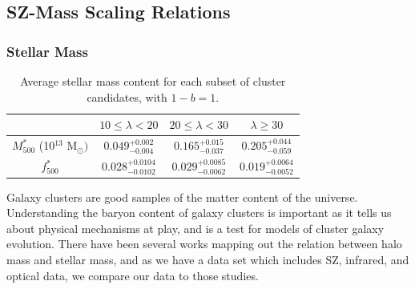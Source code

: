 \documentclass[a4paper,fleqn,usenatbib]{mnras}
\begin{document}
\iffalse
\subsection{SZ-Mass Scaling Relations}

\subsubsection{Stellar Mass}

\begin{table}
  
  \centering
  \caption{Average stellar mass content for each subset of cluster candidates, with $1-b=1$.}
  \begin{threeparttable}
  \begin{tabular}{|*{4}{c|}}
    \hline
    & $10 \leq \lambda < 20$ & $20 \leq \lambda < 30$ & $\lambda \geq 30$ \\ \hline
	 $M^{\ast}_{500}$ (10$^{13}$ M$_{\odot})$ & $0.049^{+0.002}_{-0.004}$ & $0.165^{+0.015}_{-0.037}$ & $0.205^{+0.044}_{-0.059}$ \\ \hline
     $f^{\ast}_{500}$ & $0.028^{+0.0104}_{-0.0102}$ & $0.029^{+0.0085}_{-0.0062}$ & $0.019^{+0.0064}_{-0.0052}$ \\ \hline
    
    \end{tabular}
  \end{threeparttable}
\label{table:stellarmass}
\end{table}

Galaxy clusters are good samples of the matter content of the universe. Understanding the baryon content of galaxy clusters is important as it tells us about physical mechanisms at play, and is a test for models of cluster galaxy evolution. There have been several works mapping out the relation between halo mass and stellar mass, and as we have a data set which includes SZ, infrared, and optical data, we compare our data to those studies. 
\end{document}
